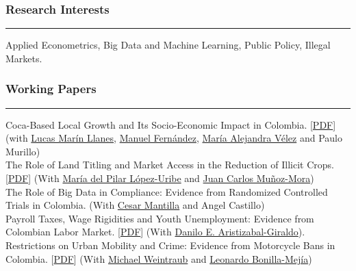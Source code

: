 \documentclass[12pt]{article}
\begin{document}
\subsubsection*{Research Interests}
\vspace{-20pt}
\rule{\textwidth}{1pt} 
Applied Econometrics, Big Data and Machine Learning, Public Policy, Illegal Markets.

\subsubsection*{Working Papers}
\vspace{-20pt}
\rule{\textwidth}{1pt} 

Coca-Based Local Growth and Its Socio-Economic Impact in Colombia. [\href{https://papers.ssrn.com/sol3/papers.cfm?abstract_id=4931812}{PDF}] (with \href{https://scholar.google.com/citations?user=eKUIyD0AAAAJ&hl=es}{Lucas Marín Llanes}, \href{https://man-fern.github.io/}{Manuel Fernández}, \href{https://sites.google.com/view/maria-alejandra-velez}{María Alejandra Vélez} and Paulo Murillo) \\

The Role of Land Titling and Market Access in the Reduction of Illicit Crops. [\href{https://www.dropbox.com/scl/fi/n66jbiiohquozfkk38ncc/fxs_crops.pdf?rlkey=c4s740k1zb1uw17zp3xa254ra&dl=0}{PDF}] (With \href{https://sites.google.com/site/marialopezuribe00/}{María del Pilar López-Uribe} and \href{https://www.eafit.edu.co/docentes-investigadores/Paginas/juan-carlos-munoz.aspx}{Juan Carlos Muñoz-Mora}) \\

The Role of Big Data in Compliance: Evidence from Randomized Controlled Trials in Colombia. (With \href{https://sites.google.com/site/cesarmantila/}{Cesar Mantilla} and Angel Castillo) \\

Payroll Taxes, Wage Rigidities and Youth Unemployment: Evidence from Colombian Labor Market. [\href{https://danilo-aristizabal.github.io/research/youth_unemployment/taxes_and_youth_unemployment.pdf}{PDF}] (With \href{https://danilo-aristizabal.github.io/}{Danilo E. Aristizabal-Giraldo}). \\

Restrictions on Urban Mobility and Crime: Evidence from Motorcycle Bans in Colombia. [\href{https://www.dropbox.com/scl/fi/ypymvh8iys7p37w26fcpv/motorcycle_restrictions_and_crime.pdf?rlkey=72pll0udfipit53jgaeib7jfd&st=zelhrw52&dl=0}{PDF}] (With \href{http://michael-weintraub.squarespace.com}{Michael Weintraub} and \href{https://investiga.banrep.gov.co/es/profile/76}{Leonardo Bonilla-Mejía}) \\
\end{document}
